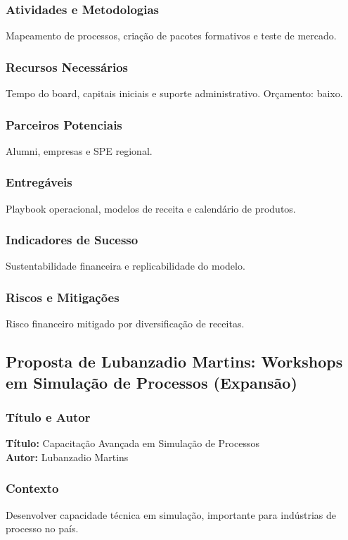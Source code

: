 \documentclass[12pt,a4paper]{article}
\begin{document}
\subsubsection*{Atividades e Metodologias}
Mapeamento de processos, criação de pacotes formativos e teste de mercado.

\subsubsection*{Recursos Necessários}
Tempo do board, capitais iniciais e suporte administrativo. Orçamento: baixo.

\subsubsection*{Parceiros Potenciais}
Alumni, empresas e SPE regional.

\subsubsection*{Entregáveis}
Playbook operacional, modelos de receita e calendário de produtos.

\subsubsection*{Indicadores de Sucesso}
Sustentabilidade financeira e replicabilidade do modelo.

\subsubsection*{Riscos e Mitigações}
Risco financeiro mitigado por diversificação de receitas.

\subsection{Proposta de Lubanzadio Martins: Workshops em Simulação de Processos (Expansão)}

\subsubsection*{Título e Autor}
\textbf{Título:} Capacitação Avançada em Simulação de Processos \\
\textbf{Autor:} Lubanzadio Martins

\subsubsection*{Contexto}
Desenvolver capacidade técnica em simulação, importante para indústrias de processo no país.
\end{document}
